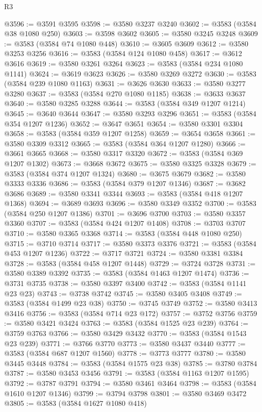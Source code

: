 \begin{lexlean}{R3}
\begin{coremodule}
@3596 := @3591 @3595
@3598 := @3580 @3237 @3240
@3602 := @3583 (@3584 @38 @1080 @250)
@3603 := @3598 @3602
@3605 := @3580 @3245 @3248
@3609 := @3583 (@3584 @74 @1080 @448)
@3610 := @3605 @3609
@3612 := @3580 @3253 @3256
@3616 := @3583 (@3584 @124 @1080 @458)
@3617 := @3612 @3616
@3619 := @3580 @3261 @3264
@3623 := @3583 (@3584 @234 @1080 @1141)
@3624 := @3619 @3623
@3626 := @3580 @3269 @3272
@3630 := @3583 (@3584 @239 @1080 @1163)
@3631 := @3626 @3630
@3633 := @3580 @3277 @3280
@3637 := @3583 (@3584 @270 @1080 @1185)
@3638 := @3633 @3637
@3640 := @3580 @3285 @3288
@3644 := @3583 (@3584 @349 @1207 @1214)
@3645 := @3640 @3644
@3647 := @3580 @3293 @3296
@3651 := @3583 (@3584 @354 @1207 @1236)
@3652 := @3647 @3651
@3654 := @3580 @3301 @3304
@3658 := @3583 (@3584 @359 @1207 @1258)
@3659 := @3654 @3658
@3661 := @3580 @3309 @3312
@3665 := @3583 (@3584 @364 @1207 @1280)
@3666 := @3661 @3665
@3668 := @3580 @3317 @3320
@3672 := @3583 (@3584 @369 @1207 @1302)
@3673 := @3668 @3672
@3675 := @3580 @3325 @3328
@3679 := @3583 (@3584 @374 @1207 @1324)
@3680 := @3675 @3679
@3682 := @3580 @3333 @3336
@3686 := @3583 (@3584 @379 @1207 @1346)
@3687 := @3682 @3686
@3689 := @3580 @3341 @3344
@3693 := @3583 (@3584 @418 @1207 @1368)
@3694 := @3689 @3693
@3696 := @3580 @3349 @3352
@3700 := @3583 (@3584 @250 @1207 @1386)
@3701 := @3696 @3700
@3703 := @3580 @3357 @3360
@3707 := @3583 (@3584 @424 @1207 @1408)
@3708 := @3703 @3707
@3710 := @3580 @3365 @3368
@3714 := @3583 (@3584 @448 @1080 @250)
@3715 := @3710 @3714
@3717 := @3580 @3373 @3376
@3721 := @3583 (@3584 @453 @1207 @1236)
@3722 := @3717 @3721
@3724 := @3580 @3381 @3384
@3728 := @3583 (@3584 @458 @1207 @1448)
@3729 := @3724 @3728
@3731 := @3580 @3389 @3392
@3735 := @3583 (@3584 @1463 @1207 @1474)
@3736 := @3731 @3735
@3738 := @3580 @3397 @3400
@3742 := @3583 (@3584 @1141 @23 @23)
@3743 := @3738 @3742
@3745 := @3580 @3405 @3408
@3749 := @3583 (@3584 @1499 @23 @38)
@3750 := @3745 @3749
@3752 := @3580 @3413 @3416
@3756 := @3583 (@3584 @714 @23 @172)
@3757 := @3752 @3756
@3759 := @3580 @3421 @3424
@3763 := @3583 (@3584 @1525 @23 @239)
@3764 := @3759 @3763
@3766 := @3580 @3429 @3432
@3770 := @3583 (@3584 @1543 @23 @239)
@3771 := @3766 @3770
@3773 := @3580 @3437 @3440
@3777 := @3583 (@3584 @687 @1207 @1560)
@3778 := @3773 @3777
@3780 := @3580 @3445 @3448
@3784 := @3583 (@3584 @1575 @23 @38)
@3785 := @3780 @3784
@3787 := @3580 @3453 @3456
@3791 := @3583 (@3584 @1163 @1207 @1595)
@3792 := @3787 @3791
@3794 := @3580 @3461 @3464
@3798 := @3583 (@3584 @1610 @1207 @1346)
@3799 := @3794 @3798
@3801 := @3580 @3469 @3472
@3805 := @3583 (@3584 @1627 @1080 @418)

\end{coremodule}
\end{lexlean}
